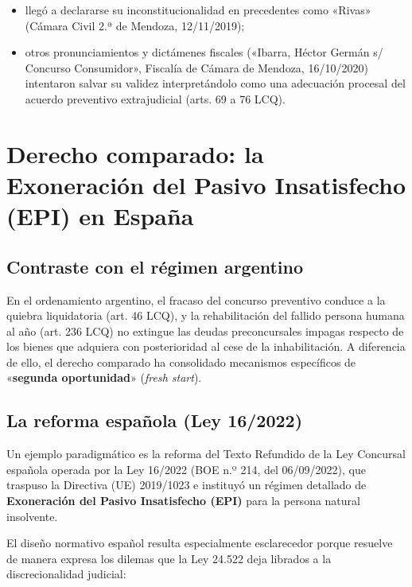 \documentclass[12pt,oneside]{book}
\begin{document}
\begin{itemize}
    \item llegó a declararse su inconstitucionalidad en precedentes como «Rivas» (Cámara Civil 2.ª de Mendoza, 12/11/2019);
    \item otros pronunciamientos y dictámenes fiscales («Ibarra, Héctor Germán s/ Concurso Consumidor», Fiscalía de Cámara de Mendoza, 16/10/2020) intentaron salvar su validez interpretándolo como una adecuación procesal del acuerdo preventivo extrajudicial (arts. 69 a 76 LCQ).
\end{itemize}

\section{Derecho comparado: la Exoneración del Pasivo Insatisfecho (EPI) en España}

\subsection{Contraste con el régimen argentino}

En el ordenamiento argentino, el fracaso del concurso preventivo conduce a la quiebra liquidatoria (art. 46 LCQ), y la rehabilitación del fallido persona humana al año (art. 236 LCQ) no extingue las deudas preconcursales impagas respecto de los bienes que adquiera con posterioridad al cese de la inhabilitación. A diferencia de ello, el derecho comparado ha consolidado mecanismos específicos de «\textbf{segunda oportunidad}» (\textit{fresh start}).

\subsection{La reforma española (Ley 16/2022)}

Un ejemplo paradigmático es la reforma del Texto Refundido de la Ley Concursal española operada por la Ley 16/2022 (BOE n.º 214, del 06/09/2022), que traspuso la Directiva (UE) 2019/1023 e instituyó un régimen detallado de \textbf{Exoneración del Pasivo Insatisfecho (EPI)} para la persona natural insolvente.

El diseño normativo español resulta especialmente esclarecedor porque resuelve de manera expresa los dilemas que la Ley 24.522 deja librados a la discrecionalidad judicial:
\end{document}
